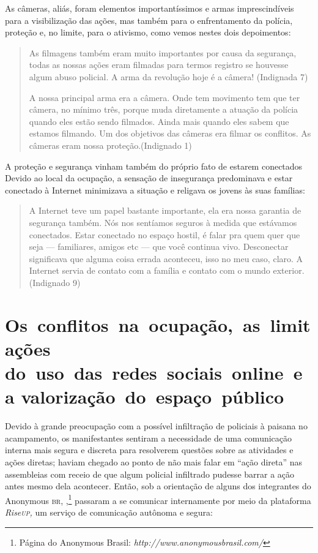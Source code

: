 As câmeras, aliás, foram elementos importantíssimos e armas
imprescindíveis para a visibilização das ações, mas também para o
enfrentamento da polícia, proteção e, no limite, para o ativismo, como
vemos nestes dois depoimentos:

\begin{quote}
As filmagens também eram muito importantes por causa da segurança, todas
as nossas ações eram filmadas para termos registro se houvesse algum
abuso policial. A arma da revolução hoje é a câmera! (Indignada 7)

A nossa principal arma era a câmera. Onde tem movimento tem que ter
câmera, no mínimo três, porque muda diretamente a atuação da polícia
quando eles estão sendo filmados. Ainda mais quando eles sabem que
estamos filmando. Um dos objetivos das câmeras era filmar os conflitos.
As câmeras eram nossa proteção.(Indignado 1)
\end{quote}

A proteção e segurança vinham também do próprio fato de estarem
conectados Devido ao local da ocupação, a sensação de insegurança
predominava e estar conectado à Internet minimizava a situação e
religava os jovens às suas famílias:

\begin{quote}
A Internet teve um papel bastante importante, ela era nossa garantia de
segurança também. Nós nos sentíamos seguros à medida que estávamos
conectados. Estar conectado no espaço hostil, é falar pra quem quer que
seja --- familiares, amigos etc --- que você continua vivo. Desconectar
significava que alguma coisa errada aconteceu, isso no meu caso, claro.
A Internet servia de contato com a família e contato com o mundo
exterior. (Indignado 9)
\end{quote}

\section{Os~conflitos~na~ocupação,~as~limitações do~uso~das~redes~sociais~online~e~a valorização~do~espaço~público}

Devido à grande preocupação com a possível infiltração de policiais à
paisana no acampamento, os manifestantes sentiram a necessidade de
uma comunicação interna mais segura e discreta para resolverem questões
sobre as atividades e ações diretas; haviam chegado ao ponto de não mais
falar em ``ação direta'' nas assembleias com receio de que algum
policial infiltrado pudesse barrar a ação antes mesmo dela acontecer.
Então, sob a orientação de alguns dos integrantes do Anonymous \textsc{br},
,\footnote{Página do Anonymous Brasil:
  \emph{http://www.anonymousbrasil.com/}} passaram a se comunicar
internamente por meio da plataforma \emph{Rise\textsc{up},} um serviço de
comunicação autônoma e segura:


